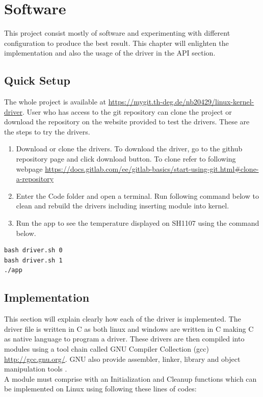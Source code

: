 \chapter{Software}
This project consist mostly of software and experimenting with different configuration to produce the best result. This chapter will enlighten the implementation and also the usage of the driver in the API section.

\section{Quick Setup}
The whole project is available at \url{https://mygit.th-deg.de/nb20429/linux-kernel-driver}. User who has access to the git repository can clone the project or download the repository on the website provided to test the drivers. These are the steps to try the drivers.

\begin{enumerate}
	\item Download or clone the drivers. To download the driver, go to the github repository page and click download button. To clone refer to following webpage \url{https://docs.gitlab.com/ee/gitlab-basics/start-using-git.html#clone-a-repository}
	\item Enter the Code folder and open a terminal. Run following command below to clean and rebuild the drivers including inserting module into kernel.
	\item Run the app to see the temperature displayed on SH1107 using the command below.
\end{enumerate}

\begin{verbatim}
bash driver.sh 0
bash driver.sh 1
./app
\end{verbatim}

\section{Implementation}
This section will explain clearly how each of the driver is implemented. The driver file is written in C as both linux and windows are written in C making C as native language to program a driver. These drivers are then compiled into modules using a tool chain called GNU Compiler Collection (gcc) \url{http://gcc.gnu.org/}. GNU also provide assembler, linker, library and object manipulation tools \cite{barry_chapter_2012}.\\

A module must comprise with an Initialization and Cleanup functions \cite{rubini_linux_2001} which can be implemented on Linux using following these lines of codes:

